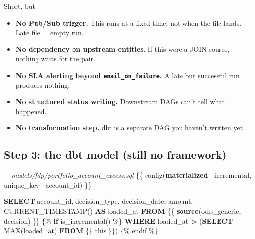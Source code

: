 \documentclass[
  11pt,
  british,
  oneside]{book}
\newenvironment{Shaded}{\begin{snugshade}}{\end{snugshade}}
\newcommand{\CommentTok}[1]{\textcolor[rgb]{0.56,0.35,0.01}{\textit{#1}}}
\newcommand{\ControlFlowTok}[1]{\textcolor[rgb]{0.13,0.29,0.53}{\textbf{#1}}}
\newcommand{\FunctionTok}[1]{\textcolor[rgb]{0.00,0.00,0.00}{#1}}
\newcommand{\KeywordTok}[1]{\textcolor[rgb]{0.13,0.29,0.53}{\textbf{#1}}}
\newcommand{\NormalTok}[1]{#1}
\newcommand{\OperatorTok}[1]{\textcolor[rgb]{0.81,0.36,0.00}{\textbf{#1}}}
\newcommand{\StringTok}[1]{\textcolor[rgb]{0.31,0.60,0.02}{#1}}
\providecommand{\tightlist}{%
  \setlength{\itemsep}{0pt}\setlength{\parskip}{0pt}}
\begin{document}
Short, but:

\begin{itemize}
\tightlist
\item
  \textbf{No Pub/Sub trigger.} This runs at a fixed time, not when the
  file lands. Late file = empty run.
\item
  \textbf{No dependency on upstream entities.} If this were a JOIN
  source, nothing waits for the pair.
\item
  \textbf{No SLA alerting beyond \texttt{email\_on\_failure}.} A late
  but successful run produces nothing.
\item
  \textbf{No structured status writing.} Downstream DAGs can't tell what
  happened.
\item
  \textbf{No transformation step.} dbt is a separate DAG you haven't
  written yet.
\end{itemize}

\hypertarget{step-3-the-dbt-model-still-no-framework}{%
\subsection{Step 3: the dbt model (still no
framework)}\label{step-3-the-dbt-model-still-no-framework}}

\begin{Shaded}
\begin{Highlighting}[]
\CommentTok{{-}{-} models/fdp/portfolio\_account\_excess.sql}
\NormalTok{\{\{ config(}\KeywordTok{materialized}\OperatorTok{=}\StringTok{\textquotesingle{}incremental\textquotesingle{}}\NormalTok{, unique\_key}\OperatorTok{=}\StringTok{\textquotesingle{}account\_id\textquotesingle{}}\NormalTok{) \}\}}

\KeywordTok{SELECT}
\NormalTok{    account\_id,}
\NormalTok{    decision\_type,}
\NormalTok{    decision\_date,}
\NormalTok{    amount,}
    \FunctionTok{CURRENT\_TIMESTAMP}\NormalTok{() }\KeywordTok{AS}\NormalTok{ loaded\_at}
\KeywordTok{FROM}\NormalTok{ \{\{ }\KeywordTok{source}\NormalTok{(}\StringTok{\textquotesingle{}odp\_generic\textquotesingle{}}\NormalTok{, }\StringTok{\textquotesingle{}decision\textquotesingle{}}\NormalTok{) \}\}}
\NormalTok{\{\% }\ControlFlowTok{if}\NormalTok{ is\_incremental() \%\}}
\KeywordTok{WHERE}\NormalTok{ loaded\_at }\OperatorTok{\textgreater{}}\NormalTok{ (}\KeywordTok{SELECT} \FunctionTok{MAX}\NormalTok{(loaded\_at) }\KeywordTok{FROM}\NormalTok{ \{\{ this \}\})}
\NormalTok{\{\% endif \%\}}
\end{Highlighting}
\end{Shaded}
\end{document}
